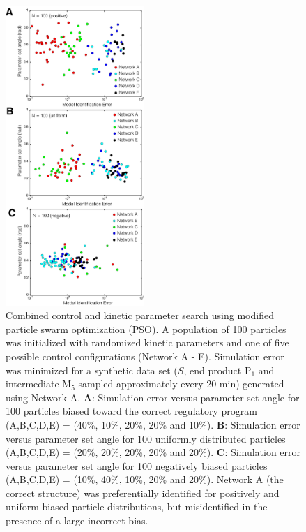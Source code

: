 \documentclass[processes,article,accept,moreauthors,pdftex,12pt,a4paper]{mdpi}
\begin{document}
\begin{figure}[H]
\centering
\includegraphics[width=0.47\textwidth]{./figs/Figure-7-ControlSearch.pdf}
\caption{Combined control and kinetic parameter search using modified particle swarm optimization (PSO). 
A population of 100 particles was initialized with randomized kinetic parameters and one of five possible control configurations (Network A - E).
Simulation error was minimized for a synthetic data set 
($S$, end product P$_{1}$ and intermediate M$_5$ sampled approximately every 20 min) generated using Network A.
\textbf{A}: Simulation error versus parameter set angle for 100 particles biased toward the correct regulatory program (A,B,C,D,E) = (40\%, 10\%, 20\%, 20\% and 10\%).
\textbf{B}: Simulation error versus parameter set angle for 100 uniformly distributed particles (A,B,C,D,E) = (20\%, 20\%, 20\%, 20\% and 20\%).
\textbf{C}: Simulation error versus parameter set angle for 100 negatively biased particles (A,B,C,D,E) = (10\%, 40\%, 10\%, 20\% and 20\%).
Network A (the correct structure) was preferentially identified for positively and uniform biased particle distributions, but misidentified in the presence of
a large incorrect bias. }\label{fig-control-search}
\end{figure}
\end{document}
